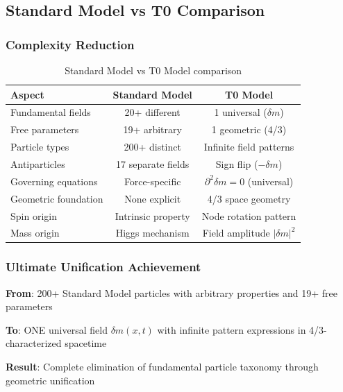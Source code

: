 	\subsection{Standard Model vs T0 Comparison}
	\label{subsec:sm_vs_t0}
	
	\subsubsection{Complexity Reduction}
	\label{subsubsec:complexity_reduction}
	
	\begin{table}[htbp]
		\centering
		\begin{tabular}{lcc}
			\toprule
			\textbf{Aspect} & \textbf{Standard Model} & \textbf{T0 Model} \\
			\midrule
			Fundamental fields & 20+ different & 1 universal ($\delta m$) \\
			Free parameters & 19+ arbitrary & 1 geometric (4/3) \\
			Particle types & 200+ distinct & Infinite field patterns \\
			Antiparticles & 17 separate fields & Sign flip ($-\delta m$) \\
			Governing equations & Force-specific & $\partial^2\delta m = 0$ (universal) \\
			Geometric foundation & None explicit & 4/3 space geometry \\
			Spin origin & Intrinsic property & Node rotation pattern \\
			Mass origin & Higgs mechanism & Field amplitude $|\delta m|^2$ \\
			\bottomrule
		\end{tabular}
		\caption{Standard Model vs T0 Model comparison}
		\label{tab:detailed_comparison}
	\end{table}
	
	\subsubsection{Ultimate Unification Achievement}
	\label{subsubsec:ultimate_unification}
	
	\begin{tcolorbox}[colback=green!5!white,colframe=green!75!black,title=T0 Unification Achievement]
		\textbf{From}: 200+ Standard Model particles with arbitrary properties and 19+ free parameters
		
		\textbf{To}: ONE universal field $\delta m(x,t)$ with infinite pattern expressions in 4/3-characterized spacetime
		
		\textbf{Result}: Complete elimination of fundamental particle taxonomy through geometric unification
	\end{tcolorbox}
	
